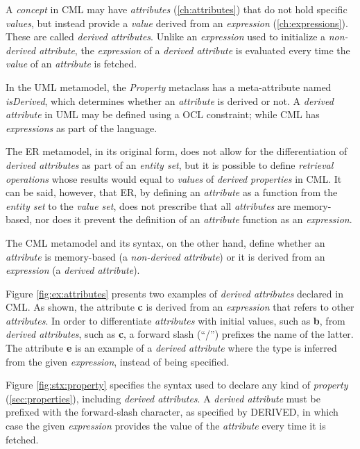 A \emph{concept} in CML may have \emph{attributes} (\ref{ch:attributes})
that do not hold specific \emph{values},
but instead provide a \emph{value} derived from an \emph{expression} (\ref{ch:expressions}).
These are called \emph{derived attributes}.
Unlike an \emph{expression} used to initialize a \emph{non-derived attribute},
the \emph{expression} of a \emph{derived attribute} is evaluated
every time the \emph{value} of an \emph{attribute} is fetched.

In the UML \cite{uml} metamodel,
the \emph{Property} metaclass has a meta-attribute named \emph{isDerived},
which determines whether an \emph{attribute} is derived or not.
A \emph{derived attribute} in UML may be defined using a OCL \cite{ocl} constraint;
while CML has \emph{expressions} as part of the language.

The ER \cite{er} metamodel,
in its original form,
does not allow for the differentiation of \emph{derived attributes}
as part of an \emph{entity set},
but it is possible to define \emph{retrieval operations} whose 
results would equal to \emph{values} of \emph{derived properties} in CML.
It can be said, however, that ER,
by defining an \emph{attribute} as a function from the \emph{entity set}
to the \emph{value set},
does not prescribe that all \emph{attributes} are memory-based,
nor does it prevent the definition of an \emph{attribute} function 
as an \emph{expression}.

The CML metamodel and its syntax, on the other hand,
define whether an \emph{attribute} is memory-based (a \emph{non-derived attribute})
or it is derived from an \emph{expression} (a \emph{derived attribute}).

\begin{examples}
Figure \ref{fig:ex:attributes} presents two examples of \emph{derived attributes}
declared in CML.
As shown,
the attribute \textbf{c} is derived from an \emph{expression}
that refers to other \emph{attributes}.
In order to differentiate \emph{attributes} with initial values,
such as \textbf{b},
from \emph{derived attributes},
such as \textbf{c},
a forward slash (``/'') prefixes the name of the latter.
The attribute \textbf{e} is an example of a \emph{derived attribute}
where the type is inferred from the given \emph{expression},
instead of being specified.
\end{examples}

\begin{concrete-syntax}
Figure \ref{fig:stx:property} specifies the syntax used
to declare any kind of \emph{property} (\ref{sec:properties}),
including \emph{derived attributes}.
A \emph{derived attribute} must be prefixed with the forward-slash character,
as specified by DERIVED,
in which case the given \emph{expression} provides the value
of the \emph{attribute} every time it is fetched.
\end{concrete-syntax}

